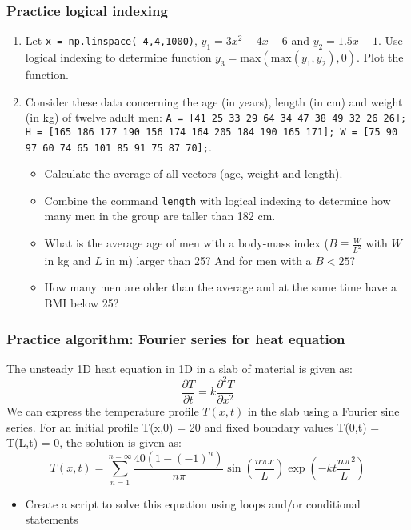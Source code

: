  \begin{frame}[fragile]
  \frametitle{Practice logical indexing}
  \begin{enumerate}
    \item Let \lstinline$x = np.linspace(-4,4,1000)$, $y_1 = 3x^2 - 4x - 6$ and $y_2 = 1.5x - 1$. Use logical indexing to determine function $y_3 = \mathrm{max}(\mathrm{max}(y_1,y_2),0)$. Plot the function.
    \item Consider these data concerning the age (in years), length (in cm) and weight (in kg) of twelve adult men: \lstinline$A = [41 25 33 29 64 34 47 38 49 32 26 26]; H = [165 186 177 190 156 174 164 205 184 190 165 171]; W = [75 90 97 60 74 65 101 85 91 75 87 70];$.
    \begin{itemize}
      \item Calculate the average of all vectors (age, weight and length).
      \item Combine the command \lstinline$length$ with logical indexing to determine how many men in the group are taller than 182 cm.
      \item What is the average age of men with a body-mass index ($B \equiv \frac{W}{L^2}$ with $W$ in kg and $L$ in m) larger than 25? And for men with a $B<25$?
      \item How many men are older than the average and at the same time have a BMI below 25?
    \end{itemize}
  \end{enumerate}
 \end{frame}

\begin{frame}[fragile]
  \frametitle{Practice algorithm: Fourier series for heat equation}
  The unsteady 1D heat equation in 1D in a slab of material is given as:
  \[
     \frac{\partial T}{\partial t} = k\frac{\partial^2 T}{\partial x^2}
  \]
 We can express the temperature profile $T(x,t)$ in the slab using a Fourier sine series. For an initial profile T(x,0) = 20 and fixed boundary values T(0,t) = T(L,t) = 0, the solution is given as:
  \[
     T(x,t) = \sum_{n=1}^{n=\infty}\frac{40(1-(-1)^n)}{n\pi}  \sin\left(\frac{n\pi x}{L}\right) \exp\left(-kt\frac{n \pi}{L}^2\right)
  \]
  \begin{itemize}
      \item Create a script to solve this equation using loops and/or conditional statements
  \end{itemize}
 \end{frame}
 
 
